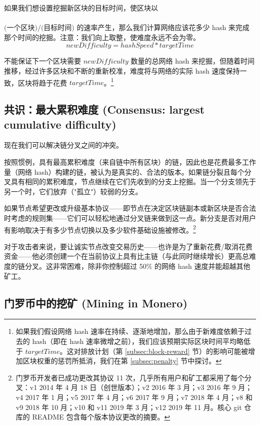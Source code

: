 如果我们想设置挖掘新区块的目标时间，使区块以\\\\ \(\textrm{(一个区块)/(目标时间)}\) 的速率产生，那么我们计算网络应该花多少 hash 来完成那个时间的挖掘。注意：我们向上取整，使难度永远不会为零。%
\[\mathit{newDifficulty} = \mathit{hashSpeed}*\mathit{targetTime}\]

不能保证下一个区块需要 $\mathit{newDifficulty}$ 数量的总网络 hash 来挖掘，但随着时间推移，经过许多区块和不断的重新校准，难度将与网络的实际 hash 速度保持一致，区块将趋于花费 $\mathit{targetTime}$。\footnote{如果我们假设网络 hash 速率在持续、逐渐地增加，那么由于新难度依赖于{过去的} hash（即在 hash 速率微增之前），我们应该预期实际区块时间平均略低于 $\mathit{targetTime}$。这对排放计划（第 \ref{subsec:block-reward} 节）的影响可能被增加区块权重的惩罚所抵消，我们在第 \ref{subsec:penalty} 节中探讨。}


\subsection{共识：最大累积难度 (Consensus: largest cumulative difficulty)}

现在我们可以解决链分叉之间的冲突。

按照惯例，具有最高累积难度（来自链中所有区块）的链，因此也是花费最多工作量（网络 hash）构建的链，被认为是真实的、合法的版本。如果链分裂且每个分叉具有相同的累积难度，节点继续在它们先收到的分支上挖掘。当一个分支领先于另一个时，它们放弃（"孤立"）较弱的分支。%

如果节点希望更改或升级基本协议——即节点在决定区块链副本或新区块是否合法时考虑的规则集——它们可以轻松地通过分叉链来做到这一点。新分支是否对用户有影响取决于有多少节点切换以及多少软件基础设施被修改。\footnote{门罗币开发者已成功更改其协议 11 次，几乎所有用户和矿工都采用了每个分叉：v1 2014 年 4 月 18 日（创世版本）\cite{bitmonero-launched}；v2 2016 年 3 月；v3 2016 年 9 月；v4 2017 年 1 月；v5 2017 年 4 月；v6 2017 年 9 月；v7 2018 年 4 月；v8 和 v9 2018 年 10 月；v10 和 v11 2019 年 3 月；v12 2019 年 11 月。核心 git 仓库的 README 包含每个版本协议更改的摘要。}

对于攻击者来说，要让诚实节点改变交易历史——也许是为了重新花费/取消花费资金——他必须创建一个在当前协议上具有比主链（与此同时继续增长）更高总难度的链分叉。这非常困难，除非你控制超过 50\% 的网络 hash 速度并能超越其他矿工。\cite{Nakamoto_bitcoin}


\subsection{门罗币中的挖矿 (Mining in Monero)} %

